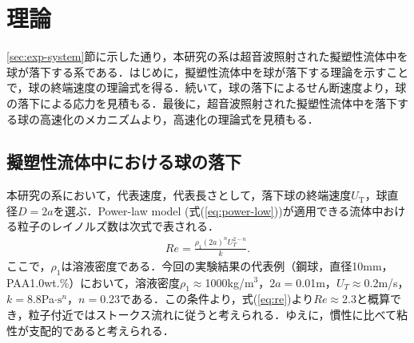 \section{理論}
\ref{sec:exp-system}節に示した通り，本研究の系は超音波照射された擬塑性流体中を球が落下する系である．はじめに，擬塑性流体中を球が落下する理論を示すことで，球の終端速度の理論式を得る．続いて，球の落下によるせん断速度より，球の落下による応力を見積もる．最後に，超音波照射された擬塑性流体中を落下する球の高速化のメカニズムより，高速化の理論式を見積もる．

\subsection{擬塑性流体中における球の落下}
本研究の系において，代表速度，代表長さとして，落下球の終端速度$U_\text{T}$，球直径$D=2a$を選ぶ．Power-law model (式(\ref{eq:power-low}))が適用できる流体中おける粒子のレイノルズ数は次式で表される\cite{ref:1,ref:8-5}．
\begin{eqnarray}
    Re = \frac{\rho_1 \left(2a\right)^n U_T^{2-n}}{k} .
    \label{eq:re}
\end{eqnarray}
ここで，$\rho_1$は溶液密度である．今回の実験結果の代表例（鋼球，直径10mm，PAA1.0wt.\%）において，溶液密度$\rho_1\approx$1000kg/m$^3$，$2a=$0.01m，$U_T \approx$0.2m/s，$k=$8.8Pa$\cdot \text{s}^n$，$n=$0.23である．この条件より，式(\ref{eq:re})より$Re\approx$2.3と概算でき，粒子付近ではストークス流れに従うと考えられる．ゆえに，慣性に比べて粘性が支配的であると考えられる．

